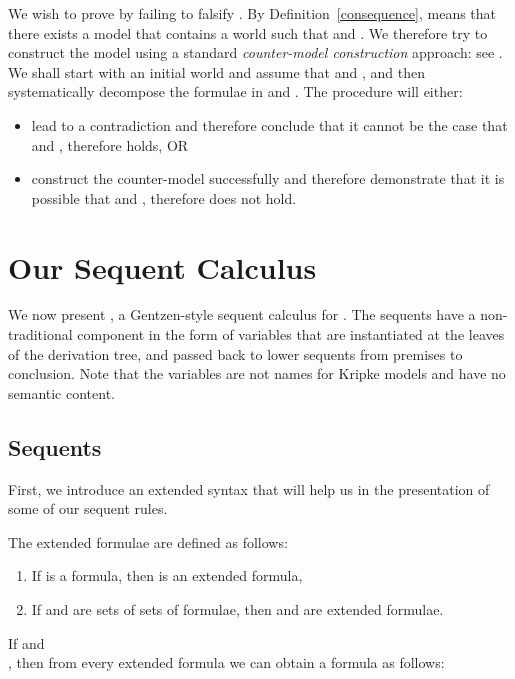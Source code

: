 \documentclass{llncs}
\numberwithin{equation}{section}
\begin{document}
We wish to prove  by failing to falsify . By Definition~\ref{consequence},  means that there exists a  model  that contains a world  such that  and . We therefore try to construct the model using a standard \textit{counter-model construction} approach: see \cite{gallier1986}. We shall start with an initial world  and assume that  and , and then systematically decompose the formulae in  and . The procedure will either:
	\begin{itemize}
		\item lead to a contradiction and therefore conclude that it cannot be the case that  and , therefore  holds, OR
		\item construct the counter-model successfully and therefore demonstrate that it is possible that  and , therefore  does not hold.
	\end{itemize}

\section{Our Sequent Calculus }\label{ourCalculus}

We now present , a Gentzen-style sequent calculus for . The sequents have a non-traditional component in the form of variables that are instantiated at the leaves of the derivation tree, and passed back to lower sequents from premises to conclusion. Note that the variables are not names for Kripke models and have no semantic content.

\subsection{Sequents}

First, we introduce an extended syntax that will help us in the presentation of some of our sequent rules.

\begin{definition}\label{extendedSyntax}
The extended  formulae are defined as follows:
\begin{enumerate}
	\item If  is a  formula, then  is an extended  formula,
	\item If  and  are sets of sets of  formulae, then  and  are extended  formulae.
\end{enumerate}
If  and \\ , then from every extended  formula we can obtain a  formula as follows:

\end{definition}
\end{document}
